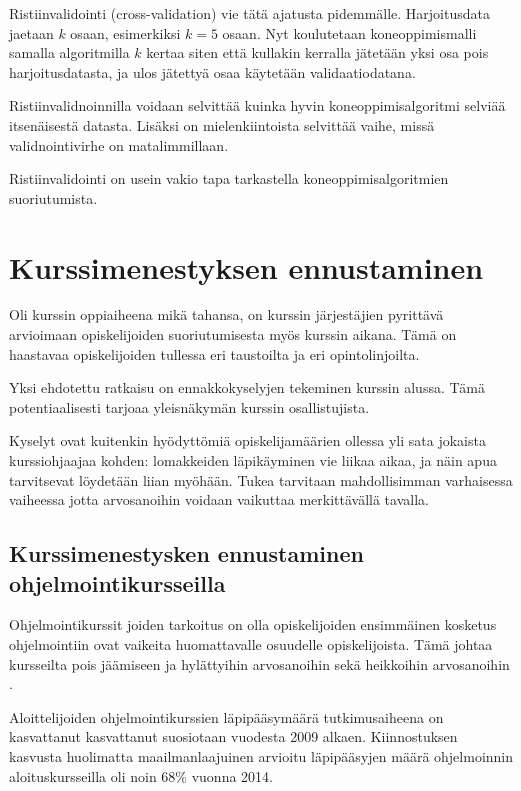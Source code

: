 \documentclass[finnish,twoside,openright]{HYgraduMLDS}
\begin{document}
Ristiinvalidointi (cross-validation) vie tätä ajatusta pidemmälle. Harjoitusdata jaetaan $k$ osaan, esimerkiksi $k=5$ osaan. Nyt koulutetaan koneoppimismalli samalla algoritmilla $k$ kertaa siten että kullakin kerralla jätetään yksi osa pois harjoitusdatasta, ja ulos jätettyä osaa käytetään validaatiodatana. 

Ristiinvalidnoinnilla voidaan selvittää kuinka hyvin koneoppimisalgoritmi selviää itsenäisestä datasta. Lisäksi on mielenkiintoista selvittää vaihe, missä validnointivirhe on matalimmillaan\cite{james2013ISLR}. 

Ristiinvalidointi on usein vakio tapa tarkastella koneoppimisalgoritmien suoriutumista\cite{james2013ISLR}.

 
\section{Kurssimenestyksen ennustaminen}

Oli kurssin oppiaiheena mikä tahansa, on kurssin järjestäjien pyrittävä arvioimaan opiskelijoiden suoriutumisesta myös kurssin aikana. Tämä on haastavaa opiskelijoiden tullessa eri taustoilta ja eri opintolinjoilta.

Yksi ehdotettu ratkaisu on ennakkokyselyjen tekeminen kurssin alussa\cite{watson2014no}. Tämä potentiaalisesti tarjoaa yleisnäkymän kurssin osallistujista.

Kyselyt ovat kuitenkin hyödyttömiä opiskelijamäärien ollessa yli sata jokaista kurssiohjaajaa kohden: lomakkeiden läpikäyminen vie liikaa aikaa, ja näin apua tarvitsevat löydetään liian myöhään. Tukea tarvitaan mahdollisimman varhaisessa vaiheessa jotta arvosanoihin voidaan vaikuttaa merkittävällä tavalla\cite{bergin2015using}.

\subsection{Kurssimenestysken ennustaminen ohjelmointikursseilla}

Ohjelmointikurssit joiden tarkoitus on olla opiskelijoiden ensimmäinen kosketus ohjelmointiin ovat vaikeita huomattavalle osuudelle opiskelijoista. Tämä johtaa kursseilta pois jäämiseen ja hylättyihin arvosanoihin sekä heikkoihin arvosanoihin \cite{bergin2015using}. 

Aloittelijoiden ohjelmointikurssien läpipääsymäärä tutkimusaiheena on kasvattanut kasvattanut suosiotaan vuodesta 2009 alkaen\cite{hellas2018predicting}. Kiinnostuksen kasvusta huolimatta maailmanlaajuinen arvioitu läpipääsyjen määrä ohjelmoinnin aloituskursseilla oli noin 68\% vuonna 2014\cite{watson2014failure}. 
\end{document}
